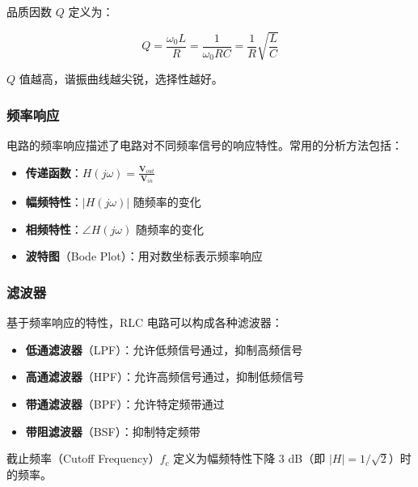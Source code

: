 品质因数 $Q$ 定义为：

\begin{equation}
Q = \frac{\omega_0 L}{R} = \frac{1}{\omega_0 RC} = \frac{1}{R}\sqrt{\frac{L}{C}} \label{eq:q-factor-ac}
\end{equation}

$Q$ 值越高，谐振曲线越尖锐，选择性越好。

\subsubsection{频率响应}

电路的频率响应描述了电路对不同频率信号的响应特性。常用的分析方法包括：

\begin{itemize}
  \item \textbf{传递函数}：$H(j\omega) = \frac{\mathbf{V}_{out}}{\mathbf{V}_{in}}$
  \item \textbf{幅频特性}：$|H(j\omega)|$ 随频率的变化
  \item \textbf{相频特性}：$\angle H(j\omega)$ 随频率的变化
  \item \textbf{波特图}（Bode Plot）：用对数坐标表示频率响应
\end{itemize}

\subsubsection{滤波器}

基于频率响应的特性，RLC 电路可以构成各种滤波器：

\begin{itemize}
  \item \textbf{低通滤波器}（LPF）：允许低频信号通过，抑制高频信号
  \item \textbf{高通滤波器}（HPF）：允许高频信号通过，抑制低频信号
  \item \textbf{带通滤波器}（BPF）：允许特定频带通过
  \item \textbf{带阻滤波器}（BSF）：抑制特定频带
\end{itemize}

截止频率（Cutoff Frequency）$f_c$ 定义为幅频特性下降 3 dB（即 $|H| = 1/\sqrt{2}$）时的频率。
